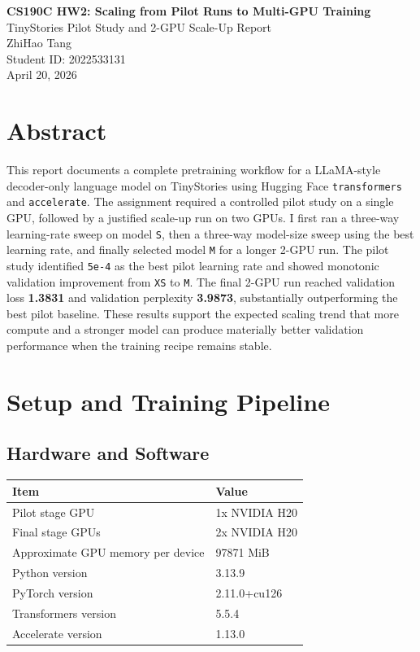 \documentclass[11pt]{article}
\begin{document}
\begin{center}
{\Large \textbf{CS190C HW2: Scaling from Pilot Runs to Multi-GPU Training}}\\[0.5em]
{\large TinyStories Pilot Study and 2-GPU Scale-Up Report}\\[1em]
ZhiHao Tang\\
Student ID: 2022533131\\
April 20, 2026
\end{center}

\section*{Abstract}

This report documents a complete pretraining workflow for a LLaMA-style decoder-only language model on TinyStories using Hugging Face \texttt{transformers} and \texttt{accelerate}. The assignment required a controlled pilot study on a single GPU, followed by a justified scale-up run on two GPUs. I first ran a three-way learning-rate sweep on model \texttt{S}, then a three-way model-size sweep using the best learning rate, and finally selected model \texttt{M} for a longer 2-GPU run. The pilot study identified \texttt{5e-4} as the best pilot learning rate and showed monotonic validation improvement from \texttt{XS} to \texttt{M}. The final 2-GPU run reached validation loss \textbf{1.3831} and validation perplexity \textbf{3.9873}, substantially outperforming the best pilot baseline. These results support the expected scaling trend that more compute and a stronger model can produce materially better validation performance when the training recipe remains stable.

\section{Setup and Training Pipeline}

\subsection{Hardware and Software}

\begin{table}[H]
\centering
\begin{tabular}{ll}
\toprule
Item & Value \\
\midrule
Pilot stage GPU & 1x NVIDIA H20 \\
Final stage GPUs & 2x NVIDIA H20 \\
Approximate GPU memory per device & 97871 MiB \\
Python version & 3.13.9 \\
PyTorch version & 2.11.0+cu126 \\
Transformers version & 5.5.4 \\
Accelerate version & 1.13.0 \\
\bottomrule
\end{tabular}
\end{table}
\end{document}
